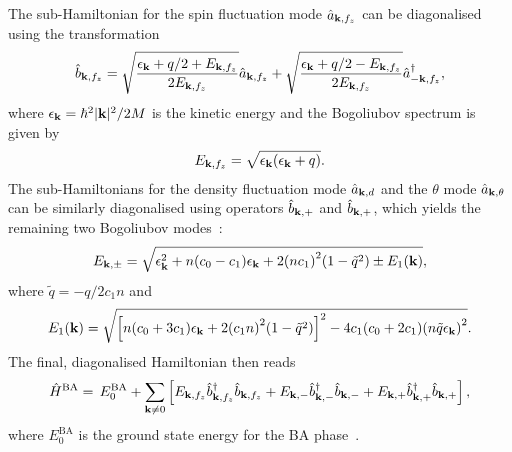 The sub-Hamiltonian for the spin fluctuation mode \(\hat{a}_{\vb{k}, f_z}\) can
be diagonalised using the transformation
\begin{align}
    \hat{b}_{\vb{k}, f_z} = \sqrt{\frac{\epsilon_{\vb{k}} + q/2
    + E_{\vb{k}, f_z}}{2E_{\vb{k}, f_z}}}\hat{a}_{\vb{k}, f_z}
    + \sqrt{\frac{\epsilon_{\vb{k}} + q/2 - E_{\vb{k}, f_z}}{2E_{\vb{k}, f_z}}}
    \hat{a}_{-\vb{k}, f_z}^\dagger,
\end{align}
where \(\epsilon_{\vb{k}} = \hbar^2|\vb{k}|^2/2M\) is the kinetic energy and the
Bogoliubov spectrum is given by
\begin{align}\label{eq: e_k-fz}
    E_{\vb{k}, {f_z}} = \sqrt{\epsilon_{\vb{k}}(\epsilon_{\vb{k}} + q)}.
\end{align}
The sub-Hamiltonians for the density fluctuation mode \(\hat{a}_{\vb{k}, d}\)
and the \(\theta \) mode
\(\hat{a}_{\vb{k}, \theta}\) can be similarly diagonalised using operators
\(\hat{b}_{\vb{k}, +}\) and \(\hat{b}_{\vb{k}, +}\), which yields the remaining
two Bogoliubov modes~\cite{Uchino2010}:
\begin{align}\label{eq: e_k-pm}
    E_{\vb{k}, \pm}= \sqrt{\epsilon_{\vb{k}}^2 + n(c_0-c_1)\epsilon_{\vb{k}}
        + 2{(nc_1)}^2(1 - \tilde{q}^2) \pm E_1(\vb{k})},
\end{align}
where \(\tilde{q} = -q/2c_1n\) and
\begin{align}
    E_1(\vb{k}) = \sqrt{{\left[n{(c_0 + 3c_1)}\epsilon_{\vb{k}}
                    + 2{(c_1n)}^2(1-\tilde{q}^2)\right]}^2
        - 4c_1(c_0+2c_1){(n\tilde{q}\epsilon_{\vb{k}})}^2}.
\end{align}
The final, diagonalised Hamiltonian then reads
\begin{align}
    \hat{H}^\text{BA} =\, E_0^\text{BA}
    + \sum_{\vb{k} \neq 0}\left[E_{\vb{k}, f_z}\hat{b}^\dagger_{\vb{k}, f_z}
    \hat{b}_{\vb{k}, f_z}
    + E_{\vb{k}, -}\hat{b}^\dagger_{\vb{k}, -}\hat{b}_{\vb{k}, -}
    + E_{\vb{k}, +}\hat{b}^\dagger_{\vb{k}, +}\hat{b}_{\vb{k}, +}\right],
\end{align}
where \(E_0^\text{BA}\) is the ground state energy for the
BA phase~\cite{Uchino2010}.


